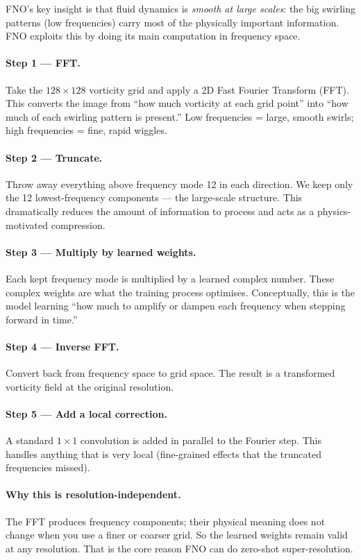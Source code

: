 \documentclass[acmsmall,nonacm]{acmart}
\begin{document}
FNO's key insight is that fluid dynamics is \emph{smooth at large scales}:
the big swirling patterns (low frequencies) carry most of the physically
important information.
FNO exploits this by doing its main computation in frequency space.

\paragraph{Step 1 --- FFT.}
Take the $128 \times 128$ vorticity grid and apply a 2D Fast Fourier Transform
(FFT).
This converts the image from ``how much vorticity at each grid point''
into ``how much of each swirling pattern is present.''
Low frequencies = large, smooth swirls; high frequencies = fine, rapid wiggles.

\paragraph{Step 2 --- Truncate.}
Throw away everything above frequency mode 12 in each direction.
We keep only the 12 lowest-frequency components --- the large-scale structure.
This dramatically reduces the amount of information to process and acts as a
physics-motivated compression.

\paragraph{Step 3 --- Multiply by learned weights.}
Each kept frequency mode is multiplied by a learned complex number.
These complex weights are what the training process optimises.
Conceptually, this is the model learning ``how much to amplify or dampen each
frequency when stepping forward in time.''

\paragraph{Step 4 --- Inverse FFT.}
Convert back from frequency space to grid space.
The result is a transformed vorticity field at the original resolution.

\paragraph{Step 5 --- Add a local correction.}
A standard $1 \times 1$ convolution is added in parallel to the Fourier step.
This handles anything that is very local (fine-grained effects that the
truncated frequencies missed).

\paragraph{Why this is resolution-independent.}
The FFT produces frequency components; their physical meaning does not change
when you use a finer or coarser grid.
So the learned weights remain valid at any resolution.
That is the core reason FNO can do zero-shot super-resolution.
\end{document}

